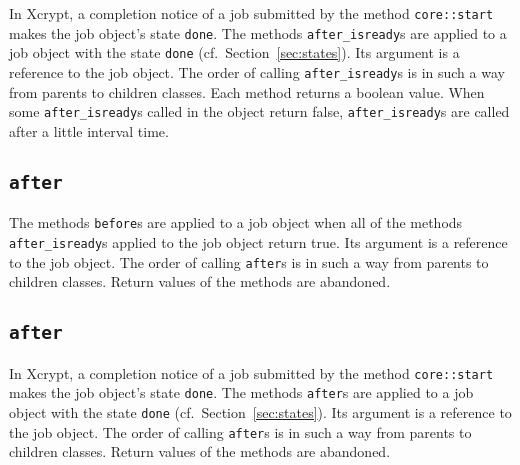 \documentclass[a4paper,10pt]{report}
\def\|{\verb|} %|
\begin{document}
In Xcrypt, a completion notice of a job submitted by the method
 \|core::start| makes the job object's state \|done|.  The methods
 \texttt{after\_isready}s are applied to a job object with the state
 \|done| (cf.\ Section~\ref{sec:states}).  Its argument is a reference
 to the job object.  The order of calling \texttt{after\_isready}s is
 in such a way from parents to children classes.  Each method
 returns a boolean value.  When some \texttt{after\_isready}s called
 in the object return false, \texttt{after\_isready}s are called
 after a little interval time.

\subsection{\texttt{after}}

The methods \texttt{before}s are applied to a job object when all of
the methods \texttt{after\_isready}s applied to the job object return
true.  Its argument is a reference to the job object.  The order of
calling \texttt{after}s is in such a way from parents to children classes.
Return values of the methods are abandoned.
\fi

\subsection{\texttt{after}}

In Xcrypt, a completion notice of a job submitted by the method
 \|core::start| makes the job object's state \|done|.  The methods
 \texttt{after}s are applied to a job object with the state \|done|
 (cf.\ Section~\ref{sec:states}).  Its argument is a reference to the
 job object.  The order of calling \texttt{after}s is in such a way
 from parents to children classes.  Return values of the methods are
 abandoned.

\end{document}
